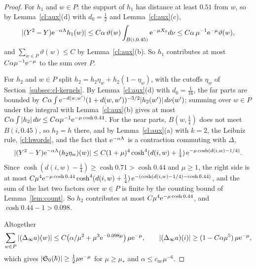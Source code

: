 \begin{proof}
For $h_1$ and $w\in P$: the support of $h_1$ has distance at least $0.51$ from $w$, so by Lemma~\ref{cl:aux}(d) with $d_0=\tfrac12$ and Lemma~\ref{cl:aux}(c),
\[
|(Y^2-Y)\mathrm{e}^{-\alpha\Lambda}h_1(w)|\le C\alpha\,\vartheta(w)\int_{B(i,0.45)}\mathrm{e}^{-\mu X_0}d\nu\le C\alpha\,\mu^{-1}\mathrm{e}^{-\mu}\vartheta(w),
\]
and $\sum_{w\in P}\vartheta(w)\le C$ by Lemma~\ref{cl:aux}(b). So $h_1$ contributes at most $C\alpha\mu^{-1}\mathrm{e}^{-\mu}$ to the sum over $P$.

For $h_2$ and $w\in P$ split $h_2=h_2\eta_w+h_2(1-\eta_w)$, with the cutoffs $\eta_w$ of Section~\ref{subsec:cl-kernels}. By
Lemma~\ref{cl:aux}(d) with $d_0=\tfrac1{16}$, the far parts are bounded by
$C\alpha\int\mathrm{e}^{-d(w,w')}(1+d(w,w'))^{-3/2}|h_2(w')|\,d\nu(w')$; summing over $w\in P$ under the integral with Lemma~\ref{cl:aux}(b) gives at most
$C\alpha\int|h_2|\,d\nu\le C\alpha\mu^{-1}\mathrm{e}^{-\mu\cosh0.44}$. For the near parts, $B(w,\tfrac14)$ does not meet $B(i,0.45)$, so $h_2=h$ there, and
by Lemma~\ref{cl:aux}(a) with $k=2$, the Leibniz rule, \eqref{cl:hwords}, and the fact that $\mathrm{e}^{-\alpha\Lambda}$ is a contraction commuting with
$\Delta$,
\[
|(Y^2-Y)\mathrm{e}^{-\alpha\Lambda}(h_2\eta_w)(w)|\le C(1+\mu)^4\cosh^4(d(i,w)+\tfrac14)\,\mathrm{e}^{-\mu\cosh(d(i,w)-1/4)} .
\]
Since $\cosh(d(i,w)-\tfrac14)\ge\cosh0.71>\cosh0.44$ and $\mu\ge1$, the right side is at most
$C\mu^4\mathrm{e}^{-\mu\cosh0.44}\cosh^4(d(i,w)+\tfrac14)\,\mathrm{e}^{-(\cosh(d(i,w)-1/4)-\cosh0.44)}$, and the sum of the last two factors over $w\in P$ is finite
by the counting bound of Lemma~\ref{lem:count}. So $h_2$ contributes at most $C\mu^4\mathrm{e}^{-\mu\cosh0.44}$, and $\cosh0.44-1>0.098$.

Altogether
\[
\sum_{w\in P}|(\Delta_\infty a)(w)|\le C\bigl(\alpha/\mu^2+\mu^3\mathrm{e}^{-0.098\mu}\bigr)\,\mu\mathrm{e}^{-\mu},\qquad|(\Delta_\infty a)(i)|\ge(1-C\alpha\mu^5)\,\mu\mathrm{e}^{-\mu},
\]
which gives $|\mathfrak S_0(\hbar)|\ge\tfrac12\mu\mathrm{e}^{-\mu}$ for $\mu\ge\mu_*$ and $\alpha\le c_{\mathrm{nc}}\mu^{-6}$.
\end{proof}

